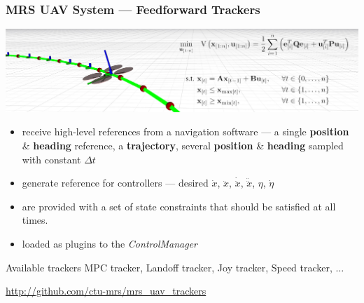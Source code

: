 \documentclass[aspectratio=1610]{beamer}
\begin{document}


  \begin{frame}
    \frametitle{MRS UAV System --- Feedforward Trackers}

    \vspace{-0.33em}

    \includegraphics[width=1.0\textwidth]{./fig/thumbnail_trackers.jpg}

    \vspace{-0.6em}

    \begin{itemize}
      \item receive high-level references from a navigation software --- a single \textbf{position} \& \textbf{heading} reference,
        a \textbf{trajectory}, several \textbf{position} \& \textbf{heading} sampled with constant $\Delta t$
      \item generate reference for controllers --- desired $\dot{x}$, $\ddot{x}$, $\dot{\ddot{x}}$, $\ddot{\ddot{x}}$, $\eta$, $\dot{\eta}$
      \item are provided with a set of state constraints that should be satisfied at all times.
      \item loaded as plugins to the \emph{ControlManager}
    \end{itemize}

    \begin{block}{Available trackers}
      MPC tracker, Landoff tracker, Joy tracker, Speed tracker, $\hdots$
    \end{block}

    \begin{block}{\cite{baca2020mrs}}
      \url{http://github.com/ctu-mrs/mrs_uav_trackers}
    \end{block}

  \end{frame}


\end{document}
